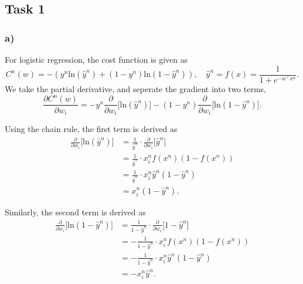 \subsection*{Task 1}

\subsubsection*{a)}

For logistic regression, the cost function is given as
\begin{equation*}
  C^n(w) = -(y^n \text{ln}(\hat{y}^n)+(1-y^n)\text{ln}(1-\hat{y}^n)), \quad \hat{y}^n=f(x)=\frac{1}{1+e^{-w^\top x^n}}.
\end{equation*}
We take the partial derivative, and seperate the gradient into two terms,
\begin{equation*}
  \frac{\partial C^n(w)}{\partial w_i} = -y^n\frac{\partial}{\partial w_i}\Big[ \text{ln}(\hat{y}^n)\Big] - (1-y^n)\frac{\partial}{\partial w_i}\Big[ \text{ln}(1-\hat{y}^n) \Big].
\end{equation*}

Using the chain rule, the first term is derived as
\begin{align*}
  \frac{\partial}{\partial w_i}\Big[ \text{ln}(\hat{y}^n)\Big] &= \frac{1}{\hat{y}^n} \cdot \frac{\partial}{\partial w_i}\Big[\hat{y}^n  \Big] \\
                                                                   &= \frac{1}{\hat{y}^n} \cdot x_i^n f(x^n) (1-f(x^n)) \\
                                                                   &= \frac{1}{\hat{y}^n} \cdot x_i^n \hat{y}^n (1-\hat{y}^n) \\
                                                                   &= x_i^n (1-\hat{y}^n).
\end{align*}

Similarly, the second term is derived as
\begin{align*}
  \frac{\partial}{\partial w_i}\Big[\text{ln}(1-\hat{y}^n)\Big]    &= \frac{1}{1-\hat{y}^n} \cdot \frac{\partial}{\partial w_i}\Big[1-\hat{y}^n  \Big] \\
                                                                   &= -\frac{1}{1-\hat{y}^n} \cdot x_i^n f(x^n) (1-f(x^n)) \\
                                                                   &= -\frac{1}{1-\hat{y}^n}  \cdot x_i^n \hat{y}^n (1-\hat{y}^n) \\
                                                                   &= -x_i^n \hat{y}^n.
\end{align*}

